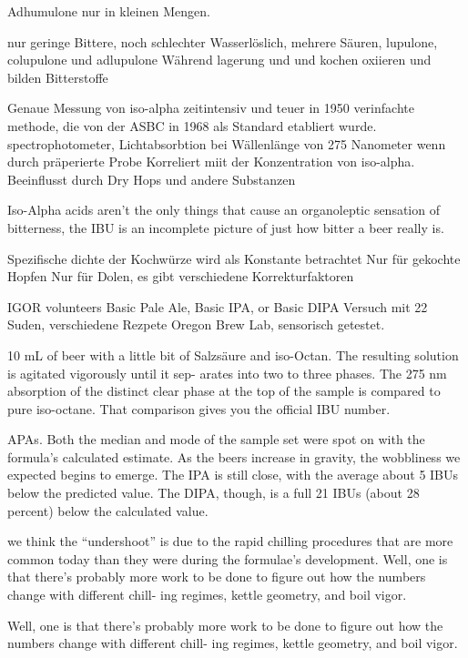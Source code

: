 \documentclass[a4paper,parskip=half]{scrartcl}
\begin{document}
\parencite[119]{Garetz1994} 
Adhumulone nur in kleinen Mengen.

\parencite[120]{Garetz1994} 
nur geringe Bittere, noch schlechter Wasserlöslich, mehrere Säuren,
lupulone, colupulone und adlupulone
Während lagerung und und kochen oxiieren und bilden Bitterstoffe

\parencite[60]{Beechum2017}
Genaue Messung von iso-alpha zeitintensiv und teuer
in 1950 verinfachte methode, die von der ASBC in 1968
als Standard etabliert wurde.
spectrophotometer, Lichtabsorbtion bei Wällenlänge
von 275 Nanometer wenn durch präperierte Probe
Korreliert miit der Konzentration von iso-alpha.
Beeinflusst durch Dry Hops und andere Substanzen

Iso-Alpha acids aren’t the only things that cause an organoleptic
sensation of bitterness, the IBU is an incomplete picture of just how bitter a
beer really is.

\parencite[61]{Beechum2017}
Spezifische dichte der Kochwürze wird als Konstante betrachtet
Nur für gekochte Hopfen
Nur für Dolen, es gibt verschiedene Korrekturfaktoren

IGOR volunteers Basic Pale Ale, Basic IPA, or
Basic DIPA 
Versuch mit 22 Suden, verschiedene Rezpete
Oregon Brew Lab, sensorisch getestet.

\parencite[62]{Beechum2017}
10 mL of beer with a little bit of Salzsäure and iso-Octan. The resulting
solution is agitated vigorously until it sep-
arates into two to three phases. The 275
nm absorption of the distinct clear phase
at the top of the sample is compared to
pure iso-octane. That comparison gives
you the official IBU number.

APAs. Both the median and mode of the
sample set were spot on with the formula’s
calculated estimate. As the beers increase
in gravity, the wobbliness we expected
begins to emerge. The IPA is still close,
with the average about 5 IBUs below the
predicted value. The DIPA, though, is a
full 21 IBUs (about 28 percent) below the
calculated value.

\parencite[65]{Beechum2017}
we think the “undershoot” is due to the
rapid chilling procedures that are more
common today than they were during the
formulae’s development.
Well,
one is that there’s probably more work
to be done to figure out how the
numbers change with different chill-
ing regimes, kettle geometry, and boil
vigor.

Well,
one is that there’s probably more work
to be done to figure out how the
numbers change with different chill-
ing regimes, kettle geometry, and boil
vigor.
\end{document}
